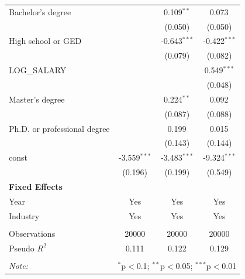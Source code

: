 \begin{table}[!htbp]
\begin{tabular}{@{\extracolsep{5pt}}lccc}
 Bachelor's degree & & 0.109$^{**}$ & 0.073$^{}$ \\
& & (0.050) & (0.050) \\
 High school or GED & & -0.643$^{***}$ & -0.422$^{***}$ \\
& & (0.079) & (0.082) \\
 LOG_SALARY & & & 0.549$^{***}$ \\
& & & (0.048) \\
 Master's degree & & 0.224$^{**}$ & 0.092$^{}$ \\
& & (0.087) & (0.088) \\
 Ph.D. or professional degree & & 0.199$^{}$ & 0.015$^{}$ \\
& & (0.143) & (0.144) \\
 const & -3.559$^{***}$ & -3.483$^{***}$ & -9.324$^{***}$ \\
& (0.196) & (0.199) & (0.549) \\
 \textbf{Fixed Effects} &  &  &  \\
 Year & Yes & Yes & Yes \\
 Industry & Yes & Yes & Yes \\
\hline \\[-1.8ex]
 Observations & 20000 & 20000 & 20000 \\
 Pseudo $R^2$ & 0.111 & 0.122 & 0.129 \\
\hline
\hline \\[-1.8ex]
\textit{Note:} & \multicolumn{3}{r}{$^{*}$p$<$0.1; $^{**}$p$<$0.05; $^{***}$p$<$0.01} \\
\end{tabular}
\end{table}